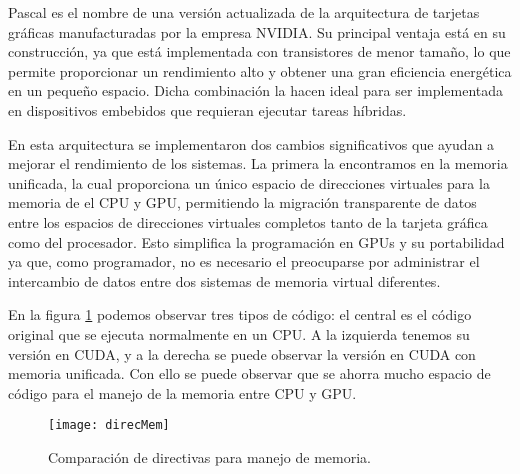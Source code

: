      Pascal es el nombre de una versión actualizada de la arquitectura de tarjetas gráficas manufacturadas por la empresa NVIDIA. Su principal ventaja está en su construcción, ya que está implementada con transistores de menor tamaño\cite{PasGPU}, lo que permite proporcionar un rendimiento alto y obtener una gran eficiencia energética en un pequeño espacio. Dicha combinación la hacen ideal para ser implementada en dispositivos embebidos que requieran ejecutar tareas híbridas.
    \newline
   
   En esta arquitectura se implementaron dos cambios significativos que ayudan a mejorar el rendimiento de los sistemas. La primera la encontramos en la memoria unificada, la cual proporciona un único espacio de direcciones virtuales para la memoria de el CPU y GPU, permitiendo la migración transparente de datos entre los espacios de direcciones virtuales completos tanto de la tarjeta gráfica como del procesador. Esto simplifica la programación en GPUs y su portabilidad ya que, como programador, no es necesario el  preocuparse por administrar el intercambio de datos entre dos sistemas de memoria virtual diferentes\cite{WPNV}.
    \newline
   
     En la figura \ref{fig:direcMem} podemos observar tres tipos de código: el central es el código original que se ejecuta normalmente en un CPU. A la izquierda tenemos su versión en CUDA, y a la derecha se puede observar la versión en CUDA con memoria unificada. Con ello se puede observar que se ahorra mucho espacio de código para el manejo de la memoria entre CPU y GPU.
       \newline
       
  \begin{figure}[ht]
      \centering
        \texttt{[image: direcMem]}
        \caption{Comparación de directivas para manejo de memoria.}
        \label{fig:direcMem}
    \end{figure}
     
